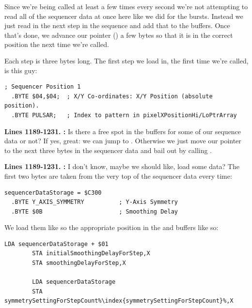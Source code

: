 Since we're being called at least a few times every second we're not attempting to read all of the sequencer data at once here like we did for the bursts. Instead we just read in the next step in
the sequence and add that to the buffers. Once that's done, we advance our pointer () a few bytes so that it is in the correct position the next time we're called.

Each step is three bytes long. The first step we load in, the first time we're called, is this guy:

\begin{lstlisting}[escapechar=\%]
  ; Sequencer Position 1
  .BYTE $04,$04;  ; X/Y Co-ordinates: X/Y Position (absolute position).   
  .BYTE PULSAR;   ; Index to pattern in pixelXPositionHi/LoPtrArray   
\end{lstlisting}

\textbf{Lines 1189-1231. :} Is there a free spot in the buffers for some of our sequence data or not? If yes, great: we can jump to .
Otherwise we just move our pointer  to the next three bytes in the sequencer data and bail out by calling . 

\textbf{Lines 1189-1231. :}  I don't know, maybe we should like, load some data? The first two bytes are taken from the very top of the sequencer data every time:
\begin{lstlisting}[escapechar=\%]
sequencerDataStorage = $C300
  .BYTE Y_AXIS_SYMMETRY          ; Y-Axis Symmetry
  .BYTE $0B                      ; Smoothing Delay
\end{lstlisting}
We load them like so the appropriate position in the  and  buffers like so:
\begin{lstlisting}[escapechar=\%]
        LDA sequencerDataStorage + $01
        STA initialSmoothingDelayForStep,X
        STA smoothingDelayForStep,X

        LDA sequencerDataStorage
        STA symmetrySettingForStepCount%\index{symmetrySettingForStepCount}%,X
\end{lstlisting}


